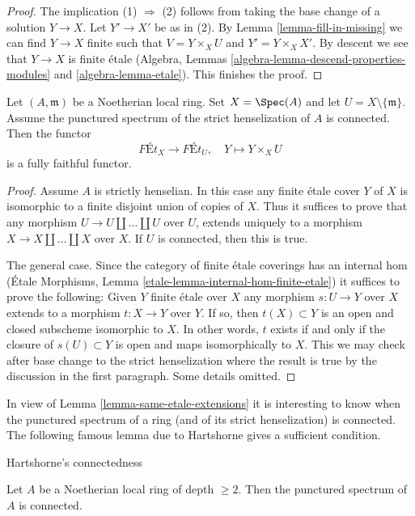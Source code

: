 \begin{proof}
The implication (1) $\Rightarrow$ (2) follows from taking the base change
of a solution $Y \to X$. Let $Y' \to X'$ be as in (2).
By Lemma \ref{lemma-fill-in-missing} we can find $Y \to X$ finite
such that $V = Y \times_X U$ and $Y' = Y \times_X X'$.
By descent we see that $Y \to X$ is finite \'etale
(Algebra, Lemmas \ref{algebra-lemma-descend-properties-modules} and
\ref{algebra-lemma-etale}). This finishes the proof.
\end{proof}

\begin{lemma}
\label{lemma-same-etale-extensions}
Let $(A, \mathfrak m)$ be a Noetherian local ring. Set $X = \Spec(A)$
and let $U = X \setminus \{\mathfrak m\}$.
Assume the punctured spectrum
of the strict henselization of $A$ is connected. Then the functor
$$
\textit{F\'Et}_X \longrightarrow \textit{F\'Et}_U,\quad
Y \longmapsto Y \times_X U
$$
is a fully faithful functor.
\end{lemma}

\begin{proof}
Assume $A$ is strictly henselian. In this case any finite \'etale
cover $Y$ of $X$ is isomorphic to a finite disjoint union of
copies of $X$. Thus it suffices to prove that any morphism
$U \to U \amalg \ldots \amalg U$ over $U$, extends uniquely to a morphism
$X \to X \amalg \ldots \amalg X$ over $X$.
If $U$ is connected, then this is true.

\medskip\noindent
The general case.
Since the category of finite \'etale coverings has an internal hom
(\'Etale Morphisms, Lemma \ref{etale-lemma-internal-hom-finite-etale})
it suffices to prove the following: Given $Y$ finite \'etale over $X$
any morphism $s : U \to Y$ over $X$ extends to a morphism $t : X \to Y$
over $Y$. If so, then $t(X) \subset Y$ is an open and closed subscheme
isomorphic to $X$. In other words, $t$ exists if and only if
the closure of $s(U) \subset Y$ is open and maps isomorphically to $X$.
This we may check after base change to the strict henselization
where the result is true by the discussion in the first paragraph.
Some details omitted.
\end{proof}

\noindent
In view of Lemma \ref{lemma-same-etale-extensions}
it is interesting to know when the
punctured spectrum of a ring (and of its strict henselization)
is connected. The following famous lemma due to Hartshorne
gives a sufficient condition.

\begin{lemma}
\label{lemma-depth-2-connected-punctured-spectrum}
\begin{reference}
\cite[Proposition 2.1]{Hartshorne-connectedness}
\end{reference}
\begin{slogan}
Hartshorne's connectedness
\end{slogan}
Let $A$ be a Noetherian local ring of depth $\geq 2$.
Then the punctured spectrum of $A$ is connected.
\end{lemma}

